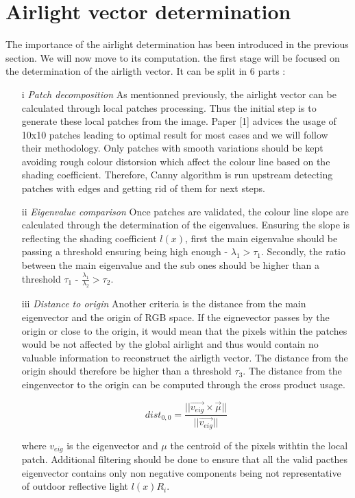 \documentclass[conference]{IEEEtran}
\begin{document}
\section{Airlight vector determination}
The importance of the airlight determination has been introduced in the previous section.  We will now move to its computation.
the first stage will be focused on the determination of the airligth vector. It can be split in 6 parts :
\begin{itemize}[]
\item[i] \textit{Patch decomposition} As mentionned previously, the airlight vector can be calculated through local patches 
processing.  Thus the initial step is to generate these local patches from the image.  Paper [1] advices the usage of 10x10
patches leading to optimal result for most cases and we will follow their methodology. Only patches with smooth variations
should be kept avoiding rough colour distorsion which affect the colour line based on the shading coefficient.  Therefore, Canny
algorithm is run upstream detecting patches with edges and getting rid of them for next steps.  
\item[ii] \textit{Eigenvalue comparison} Once patches are validated, the colour line slope are calculated through the determination
of the eigenvalues.  Ensuring the slope is reflecting the shading coefficient $l(x)$, first the main eigenvalue should be passing 
a threshold ensuring being high enough - $\lambda_1 > \tau_1$. Secondly, the ratio between the main eigenvalue and the 
sub ones should be higher than a threshold $\tau_1$ - $\frac{\lambda_1}{\lambda_2} > \tau_2$.
\item[iii] \textit{Distance to origin} Another criteria is the distance from the main eigenvector and the origin of RGB space.
If the eignevector passes by the origin or close to the origin, it would mean that the pixels within the patches would be not 
affected by the global airlight and thus would contain no valuable information to reconstruct the airligth vector.  
The distance from the origin should therefore be higher than a threshold $\tau_3$.  The distance from the eingenvector to the origin
can be computed through the cross product usage.

\begin{equation}
\label{Distance to origin}
dist_{0,0} = \frac{||\vec{v_{eig}} \times \vec{\mu}||}{||\vec{v_{eig}}||}
\end{equation}

where $v_{eig}$ is the eigenvector and $\mu$ the centroid of the pixels withtin the local patch.
Additional filtering should be done to ensure that all the valid pacthes eigenvector contains only non negative components being 
not representative of outdoor reflective light $l(x)R_i$.


\end{itemize}
\end{document}
